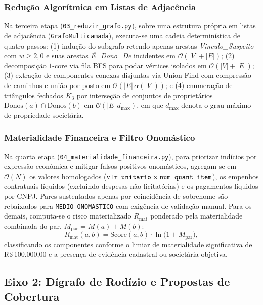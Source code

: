 \subsubsection{Redução Algorítmica em Listas de Adjacência}
Na terceira etapa (\texttt{03\_\allowbreak reduzir\_\allowbreak grafo.py}), sobre uma estrutura própria em listas de adjacência (\texttt{GrafoMulticamada}), executa-se uma cadeia determinística de quatro passos: (1) indução do subgrafo retendo apenas arestas \textit{Vinculo\_\allowbreak Suspeito} com $w \ge 2{,}0$ e suas arestas \textit{É\_\allowbreak Dono\_\allowbreak De} incidentes em $\mathcal{O}(|V|+|E|)$; (2) decomposição $1$-core via fila BFS para podar vértices isolados em $\mathcal{O}(|V|+|E|)$; (3) extração de componentes conexas disjuntas via Union-Find com compressão de caminhos e união por posto em $\mathcal{O}(|E|\,\alpha(|V|))$; e (4) enumeração de triângulos fechados $K_3$ por interseção de conjuntos de proprietários $\text{Donos}(a) \cap \text{Donos}(b)$ em $\mathcal{O}(|E|\,d_{\max})$, em que $d_{\max}$ denota o grau máximo de propriedade societária.

\subsubsection{Materialidade Financeira e Filtro Onomástico}
Na quarta etapa (\texttt{04\_\allowbreak materialidade\_\allowbreak financeira.py}), para priorizar indícios por expressão econômica e mitigar falsos positivos onomásticos, agregam-se em $\mathcal{O}(N)$ os valores homologados ($\texttt{vlr\_\allowbreak unitario} \times \texttt{num\_\allowbreak quant\_\allowbreak item}$), os empenhos contratuais líquidos (excluindo despesas não licitatórias) e os pagamentos líquidos por CNPJ. Pares sustentados apenas por coincidência de sobrenome são rebaixados para \texttt{MEDIO\_\allowbreak ONOMASTICO} com exigência de validação manual. Para os demais, computa-se o risco materializado $R_{\text{mat}}$ ponderado pela materialidade combinada do par, $M_{\text{par}} = M(a) + M(b)$:
\begin{equation}
  R_{\text{mat}}(a,b) = \text{Score}(a,b) \cdot \ln\bigl(1 + M_{\text{par}}\bigr),
\end{equation}
classificando os componentes conforme o limiar de materialidade significativa de R\$\,100.000,00 e a presença de evidência cadastral ou societária objetiva.

\subsection{Eixo 2: Dígrafo de Rodízio e Propostas de Cobertura}

